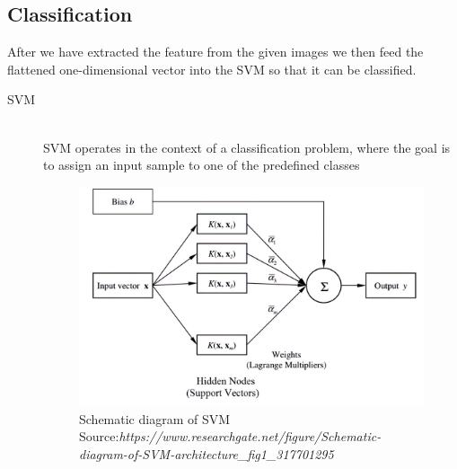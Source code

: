 \subsection{Classification}
\vspace{-18pt}
After we have extracted the feature from the given images we then feed the flattened one-dimensional vector into the SVM so that it can be classified.
\newpage
\begin{description}
\item[SVM] \hfill \\
SVM operates in the context of a classification problem, where the goal is to assign an input sample to one of the predefined classes
\begin{figure}[tbh] %
\begin{center}
	\includegraphics[width=5in]{images/svm.jpg} 
	\caption[Schematic diagram of SVM]{ \centering Schematic diagram of SVM
	\\Source:\textit{https://www.researchgate.net/figure/Schematic-diagram-of-SVM-architecture_fig1_317701295} } %


\end{center}
\end{figure}
\end{description}
